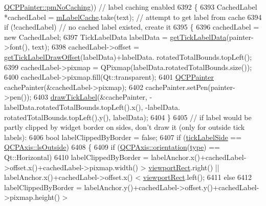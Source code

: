 \begin{DoxyCode}
      \hyperlink{class_q_c_p_painter_a156cf16444ff5e0d81a73c615fdb156dae78f9a4eb277a5f9207f50850a51a0b0}{QCPPainter::pmNoCaching})) \textcolor{comment}{// label caching enabled}
6392   \{
6393     CachedLabel *cachedLabel = \hyperlink{class_q_c_p_axis_painter_private_a07ac270ea0c0ae084debd48d6a740e35}{mLabelCache}.take(text); \textcolor{comment}{// attempt to get label from cache}
6394     \textcolor{keywordflow}{if} (!cachedLabel)  \textcolor{comment}{// no cached label existed, create it}
6395     \{
6396       cachedLabel = \textcolor{keyword}{new} CachedLabel;
6397       TickLabelData labelData = \hyperlink{class_q_c_p_axis_painter_private_ad9f24fbcbf9d8c92b34d9d00b010e6a3}{getTickLabelData}(painter->font(), text);
6398       cachedLabel->offset = \hyperlink{class_q_c_p_axis_painter_private_a6b02e6fd70cc65f726ca8cb3e6f16de4}{getTickLabelDrawOffset}(labelData)+labelData.
      rotatedTotalBounds.topLeft();
6399       cachedLabel->pixmap = QPixmap(labelData.rotatedTotalBounds.size());
6400       cachedLabel->pixmap.fill(Qt::transparent);
6401       \hyperlink{class_q_c_p_painter}{QCPPainter} cachePainter(&cachedLabel->pixmap);
6402       cachePainter.setPen(painter->pen());
6403       \hyperlink{class_q_c_p_axis_painter_private_ad8f2f12cd35b8189e8bf96679e873933}{drawTickLabel}(&cachePainter, -labelData.rotatedTotalBounds.topLeft().x(), -labelData.
      rotatedTotalBounds.topLeft().y(), labelData);
6404     \}
6405     \textcolor{comment}{// if label would be partly clipped by widget border on sides, don't draw it (only for outside tick
       labels):}
6406     \textcolor{keywordtype}{bool} labelClippedByBorder = \textcolor{keyword}{false};
6407     \textcolor{keywordflow}{if} (\hyperlink{class_q_c_p_axis_painter_private_a9d27f7625fcfbeb3a60193d0c18fc7e9}{tickLabelSide} == \hyperlink{class_q_c_p_axis_a24b13374b9b8f75f47eed2ea78c37db9a2eadb509fc0c9a8b35b85c86ec9f3c7a}{QCPAxis::lsOutside})
6408     \{
6409       \textcolor{keywordflow}{if} (\hyperlink{class_q_c_p_axis_a57483f2f60145ddc9e63f3af53959265}{QCPAxis::orientation}(\hyperlink{class_q_c_p_axis_painter_private_ae04594e97417336933d807c86d353098}{type}) == Qt::Horizontal)
6410         labelClippedByBorder = labelAnchor.x()+cachedLabel->offset.x()+cachedLabel->pixmap.width() > 
      \hyperlink{class_q_c_p_axis_painter_private_a8627dc6b40781e3291bb508e4ac574d6}{viewportRect}.right() || labelAnchor.x()+cachedLabel->offset.x() < 
      \hyperlink{class_q_c_p_axis_painter_private_a8627dc6b40781e3291bb508e4ac574d6}{viewportRect}.left();
6411       \textcolor{keywordflow}{else}
6412         labelClippedByBorder = labelAnchor.y()+cachedLabel->offset.y()+cachedLabel->pixmap.height() > 

\end{DoxyCode}
